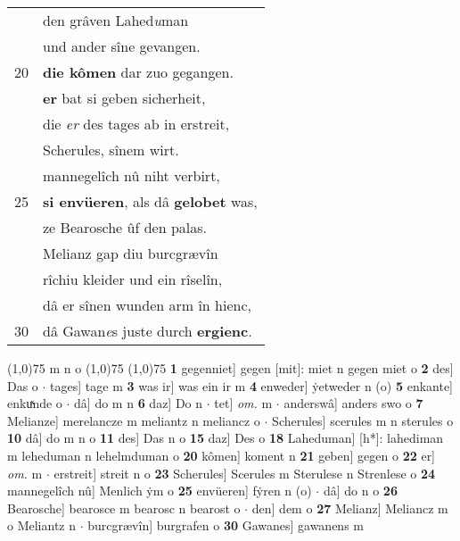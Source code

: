 \documentclass[8pt,a4paper,notitlepage]{article}
\begin{document}
\begin{table}[ht]
\begin{minipage}[t]{0.5\linewidth}
\begin{tabular}{rl}
 & den grâven Lahed\textit{u}man\\ 
 & und ander sîne gevangen.\\ 
20 & \textbf{die kômen} dar zuo gegangen.\\ 
 & \textbf{er} bat si geben sicherheit,\\ 
 & die \textit{er} des tages ab in erstreit,\\ 
 & Scherules, sînem wirt.\\ 
 & mannegelîch nû niht verbirt,\\ 
25 & \textbf{si envüeren}, als dâ \textbf{gelobet} was,\\ 
 & ze Bearosche ûf den palas.\\ 
 & Melianz gap diu burcgrævîn\\ 
 & rîchiu kleider und ein rîselîn,\\ 
 & dâ er sînen wunden arm în hienc,\\ 
30 & dâ Gawan\textit{e}s juste durch \textbf{ergienc}.\\ 
\end{tabular}
\scriptsize
\line(1,0){75} \newline
m n o \newline
\line(1,0){75} \newline
\newline
\line(1,0){75} \newline
\textbf{1} gegenniet] gegen [mit]: miet n gegen miet o \textbf{2} des] Das o  $\cdot$ tages] tage m \textbf{3} was ir] was ein ir m \textbf{4} enweder] ẏetweder n (o) \textbf{5} enkante] enkuͯnde o  $\cdot$ dâ] do m n \textbf{6} daz] Do n  $\cdot$ tet] \textit{om.} m  $\cdot$ anderswâ] anders swo o \textbf{7} Melianze] merelancze m meliantz n meliancz o  $\cdot$ Scherules] scerules m n sterules o \textbf{10} dâ] do m n o \textbf{11} des] Das n o \textbf{15} daz] Des o \textbf{18} Laheduman] [h*]: lahediman m leheduman n lehelmduman o \textbf{20} kômen] koment n \textbf{21} geben] gegen o \textbf{22} er] \textit{om.} m  $\cdot$ erstreit] streit n o \textbf{23} Scherules] Scerules m Sterulese n Strenlese o \textbf{24} mannegelîch nû] Menlich ẏm o \textbf{25} envüeren] fẏren n (o)  $\cdot$ dâ] do n o \textbf{26} Bearosche] bearosce m bearosc n bearost o  $\cdot$ den] dem o \textbf{27} Melianz] Meliancz m o Meliantz n  $\cdot$ burcgrævîn] burgrafen o \textbf{30} Gawanes] gawanens m \newline
\end{minipage}
\end{table}
\newpage
\end{document}
